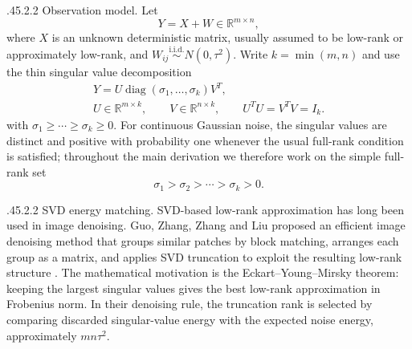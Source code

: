 \documentclass[12pt,reqno]{amsart}
\makeatletter
\numberwithin{equation}{section}
\def\paragraph{\@startsection{paragraph}{4}{\z@}%
  {.45\linespacing\@plus.2\linespacing}{.2\linespacing}%
  {\normalfont\bfseries}}
\theoremstyle{plain}
\theoremstyle{definition}
\newcommand{\diagop}{\operatorname{diag}}
\newcommand{\R}{\mathbb{R}}
\makeatother
\begin{document}
\paragraph{Observation model.}
Let
\begin{equation}
    Y=X+W\in\R^{m\times n},
\end{equation}
where $X$ is an unknown deterministic matrix, usually assumed to be low-rank or approximately low-rank, and $W_{ij}\stackrel{\mathrm{i.i.d.}}{\sim}N(0,\tau^2)$. Write $k=\min(m,n)$ and use the thin singular value decomposition
\begin{equation}
\begin{gathered}
    Y=U\diagop(\sigma_1,\ldots,\sigma_k)V^{T}, \\
    U\in\R^{m\times k},\qquad V\in\R^{n\times k},
    \qquad U^TU=V^TV=I_k.
\end{gathered}
\end{equation}
with $\sigma_1\geq\cdots\geq\sigma_k\geq 0$. For continuous Gaussian noise, the singular values are distinct and positive with probability one whenever the usual full-rank condition is satisfied; throughout the main derivation we therefore work on the simple full-rank set
\begin{equation}
    \sigma_1>\sigma_2>\cdots>\sigma_k>0.
\end{equation}

\paragraph{SVD energy matching.}
SVD-based low-rank approximation has long been used in image denoising. Guo, Zhang, Zhang and Liu proposed an efficient image denoising method that groups similar patches by block matching, arranges each group as a matrix, and applies SVD truncation to exploit the resulting low-rank structure \cite{guo2016efficient}. The mathematical motivation is the Eckart--Young--Mirsky theorem: keeping the largest singular values gives the best low-rank approximation in Frobenius norm. In their denoising rule, the truncation rank is selected by comparing discarded singular-value energy with the expected noise energy, approximately $mn\tau^2$.
\end{document}
